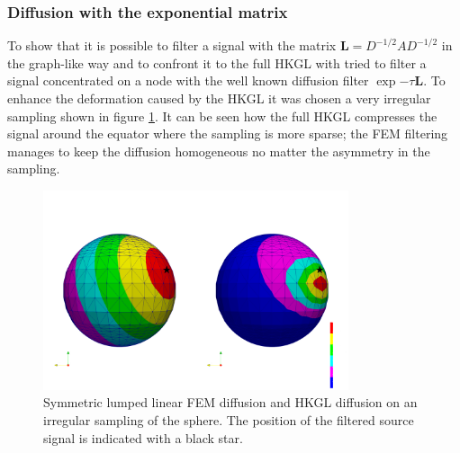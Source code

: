\subsubsection{Diffusion with the exponential matrix}

To show that it is possible to filter a signal with the matrix $\mathbf L = D^{-1/2}AD^{-1/2}$ in the graph-like way and to confront it to the full HKGL with tried to filter a signal concentrated on a node  with the well known diffusion filter $\exp{-\tau \mathbf L}$. To enhance the deformation caused by the HKGL it was chosen a very irregular sampling shown in figure \ref{fig:FEM lumped symmetric diffusion on irregular sampling}. It can be seen how the full HKGL compresses the signal around the equator where the sampling is more sparse; the FEM filtering manages to keep the diffusion homogeneous no matter the asymmetry in the sampling. 
\begin{figure}[h]
	
	\centering
	\includegraphics[width=0.8\textwidth]{figs/Chapter3/diffusion.png}
	\caption{\label{fig:FEM lumped symmetric diffusion on irregular sampling}Symmetric lumped linear FEM diffusion and HKGL diffusion on an irregular sampling of the sphere. The position of the filtered source signal is indicated with a black star.}
\end{figure}






